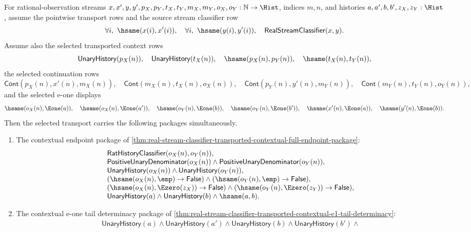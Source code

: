 \begin{theorem}
\label{thm:real-selected-transport-fit-synchronized-from-stream-classifier}
For rational-observation streams
$x,x',y,y',p_X,p_Y,t_X,t_Y,m_X,m_Y,o_X,o_Y:\mathbb{N}\to\Hist$,
indices $m,n$, and histories $a,a',b,b',z_X,z_Y:\Hist$, assume the pointwise
transport rows and the source stream classifier row
$$
\forall i,\ \hsame(x(i),x'(i)),\quad
\forall i,\ \hsame(y(i),y'(i)),\quad
\mathsf{RealStreamClassifier}(x,y).
$$
Assume also the selected transported context rows
$$
\mathsf{UnaryHistory}(p_X(n)),\quad
\mathsf{UnaryHistory}(t_X(n)),\quad
\hsame(p_X(n),p_Y(n)),\quad
\hsame(t_X(n),t_Y(n)),
$$
the selected continuation rows
$$
\mathsf{Cont}(p_X(n),x'(n),m_X(n)),\quad
\mathsf{Cont}(m_X(n),t_X(n),o_X(n)),
\quad\mathsf{Cont}(p_Y(n),y'(n),m_Y(n)),\quad
\mathsf{Cont}(m_Y(n),t_Y(n),o_Y(n)),
$$
and the selected e-one displays
$$
\hsame(o_X(n),\Eone(a)),\quad
\hsame(o_X(n),\Eone(a')),\quad
\hsame(o_Y(n),\Eone(b)),\quad
\hsame(o_Y(n),\Eone(b')),\quad
\hsame(x'(n),\Eone(a)),\quad
\hsame(y'(n),\Eone(b)).
$$
Then the selected transport carries the following packages simultaneously.
\begin{enumerate}
\item The contextual endpoint package of
\autoref{thm:real-stream-classifier-transported-contextual-full-endpoint-package}:
$$
\begin{array}{l}
\mathsf{RatHistoryClassifier}(o_X(n),o_Y(n)),\\
\mathsf{PositiveUnaryDenominator}(o_X(n))\land
\mathsf{PositiveUnaryDenominator}(o_Y(n)),\\
\mathsf{UnaryHistory}(o_X(n))\land
\mathsf{UnaryHistory}(o_Y(n)),\\
(\hsame(o_X(n),\emp)\to\mathsf{False})\land
(\hsame(o_Y(n),\emp)\to\mathsf{False}),\\
(\hsame(o_X(n),\Ezero(z_X))\to\mathsf{False})\land
(\hsame(o_Y(n),\Ezero(z_Y))\to\mathsf{False}),\\
\mathsf{UnaryHistory}(a)\land\mathsf{UnaryHistory}(b)\land\hsame(a,b).
\end{array}
$$
\item The contextual e-one tail determinacy package of
\autoref{thm:real-stream-classifier-transported-contextual-e1-tail-determinacy}:
$$
\begin{array}{l}
\mathsf{UnaryHistory}(a)\land
\mathsf{UnaryHistory}(a')\land
\mathsf{UnaryHistory}(b)\land
\mathsf{UnaryHistory}(b')\land\\

\end{array}$$
\end{enumerate}
\end{theorem}
